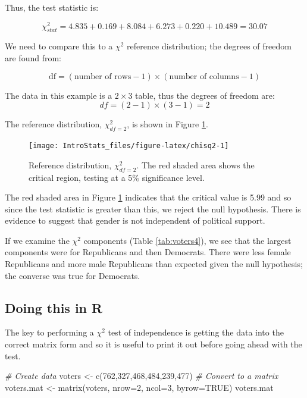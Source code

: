 \documentclass[
  oneside]{krantz}
\newenvironment{Shaded}{\begin{snugshade}}{\end{snugshade}}
\newcommand{\AttributeTok}[1]{\textcolor[rgb]{0.77,0.63,0.00}{#1}}
\newcommand{\CommentTok}[1]{\textcolor[rgb]{0.56,0.35,0.01}{\textit{#1}}}
\newcommand{\ConstantTok}[1]{\textcolor[rgb]{0.00,0.00,0.00}{#1}}
\newcommand{\DecValTok}[1]{\textcolor[rgb]{0.00,0.00,0.81}{#1}}
\newcommand{\FunctionTok}[1]{\textcolor[rgb]{0.00,0.00,0.00}{#1}}
\newcommand{\NormalTok}[1]{#1}
\newcommand{\OtherTok}[1]{\textcolor[rgb]{0.56,0.35,0.01}{#1}}
\begin{document}
Thus, the test statistic is:

\[\chi^2_{stat} = 4.835 + 0.169 + 8.084 + 6.273 + 0.220 + 10.489 = 30.07\]

We need to compare this to a \(\chi^2\) reference distribution; the degrees of freedom are found from:

\[ \textrm{df} = (\textrm{number of rows}-1) \times (\textrm{number of columns}-1) \]

The data in this example is a \(2 \times 3\) table, thus the degrees of freedom are:
\[ df = (2-1) \times (3-1) = 2\]

The reference distribution, \(\chi^2_{df=2}\), is shown in Figure \ref{fig:chisq2}.



\begin{figure}

{\centering \texttt{[image: IntroStats\_files/figure-latex/chisq2-1]} 

}

\caption{Reference distribution, \(\chi^2_{df=2}\). The red shaded area shows the critical region, testing at a 5\% significance level.}\label{fig:chisq2}
\end{figure}

The red shaded area in Figure \ref{fig:chisq2} indicates that the critical value is 5.99 and so since the test statistic is greater than this, we reject the null hypothesis. There is evidence to suggest that gender is not independent of political support.

If we examine the \(\chi^2\) components (Table \ref{tab:voters4}), we see that the largest components were for Republicans and then Democrats. There were less female Republicans and more male Republicans than expected given the null hypothesis; the converse was true for Democrats.

\hypertarget{doing-this-in-r-23}{%
\subsection{Doing this in R}\label{doing-this-in-r-23}}

The key to performing a \(\chi^2\) test of independence is getting the data into the correct matrix form and so it is useful to print it out before going ahead with the test.

\begin{Shaded}
\begin{Highlighting}[]
\CommentTok{\# Create data}
\NormalTok{voters }\OtherTok{\textless{}{-}} \FunctionTok{c}\NormalTok{(}\DecValTok{762}\NormalTok{,}\DecValTok{327}\NormalTok{,}\DecValTok{468}\NormalTok{,}\DecValTok{484}\NormalTok{,}\DecValTok{239}\NormalTok{,}\DecValTok{477}\NormalTok{)}
\CommentTok{\# Convert to a matrix}
\NormalTok{voters.mat }\OtherTok{\textless{}{-}} \FunctionTok{matrix}\NormalTok{(voters, }\AttributeTok{nrow=}\DecValTok{2}\NormalTok{, }\AttributeTok{ncol=}\DecValTok{3}\NormalTok{, }\AttributeTok{byrow=}\ConstantTok{TRUE}\NormalTok{)}
\NormalTok{voters.mat}
\end{Highlighting}
\end{Shaded}
\end{document}
